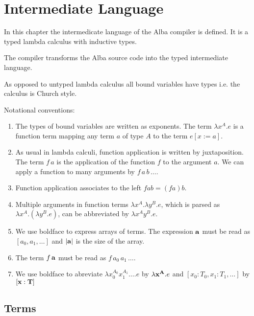 \section{Intermediate Language}

In this chapter the intermedicate language of the Alba compiler is defined. It
is a typed lambda calculus with inductive types.

The compiler transforms the Alba source code into the typed intermediate
language.

As opposed to untyped lambda calculus all bound variables have types i.e. the
calculus is Church style.

Notational conventions:
\begin{enumerate}
\item The types of bound variables are written as exponents. The term
  $\lambda x^A. e$ is a function term mapping any term $a$ of type $A$ to the
  term $e[x:=a]$.

\item As usual in lambda calculi, function application is written by
  juxtaposition. The term $f\,a$ is the application of the function $f$ to the
  argument $a$. We can apply a function to many arguments by $f \, a \, b \,
  \ldots$.

\item Function application associates to the left $f a b = (f a) b$.

\item Multiple arguments in function terms $\lambda x^A. \lambda y^B . e$,
  which is parsed as $\lambda x^A. (\lambda y^B . e)$, can be abbreviated by
  $\lambda x^A y^B. e$.

\item We use boldface to express arrays of terms. The expression $\mathbf{a}$ must
  be read as $[a_0, a_1, \ldots]$ and $|\mathbf{a}|$ is the size of the array.

\item The term $f \, \mathbf{a}$ must be read as $f \, a_0 \, a_1 \, \ldots$.

\item We use boldface to abreviate $\lambda x_0^{A_0} x_1^{A_1} \ldots . e$ by
  $\lambda \mathbf{x}^{\mathbf{A}}. e$ and $[x_0: T_0, x_1:T_1, \ldots]$ by $[\mathbf{x}: \mathbf{T}]$
\end{enumerate}







\subsection{Terms}
\label{sec:terms}


